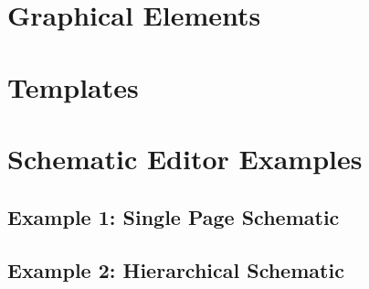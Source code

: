 \section{Graphical Elements}

\section{Templates}

\section{Schematic Editor Examples}
\subsection{Example 1: Single Page Schematic}
\subsection{Example 2: Hierarchical Schematic}